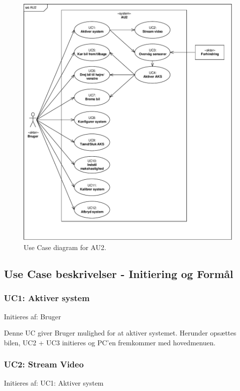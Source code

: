\begin{figure}[h]
\centering
\includegraphics[width=\textwidth - 1 cm]{../fig/diagrammer/uc_au2.pdf}
\caption{Use Case diagram for AU2.}
\label{fig:UC_au2}
\end{figure}
\clearpage



\subsection{Use Case beskrivelser - Initiering og Formål} 
\subsubsection{UC1: Aktiver system}
Initieres af: Bruger

Denne UC giver Bruger mulighed for at aktiver systemet. Herunder opsættes bilen, UC2 + UC3 initieres og PC'en fremkommer med hovedmenuen. 

\subsubsection{UC2: Stream Video}
Initieres af: UC1: Aktiver system

